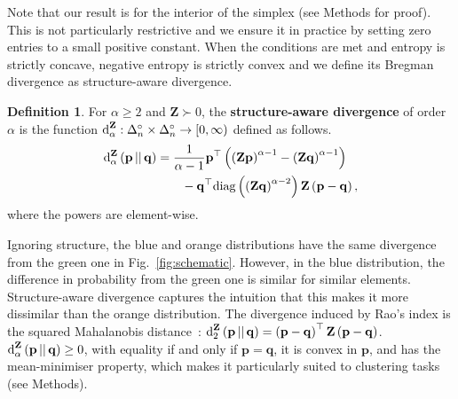 \documentclass[aps,pre,floats,floatfix,superscriptaddress,twocolumn,final,10pt]{revtex4-2}
\theoremstyle{definition}
\newtheorem{definition}{Definition}
\renewcommand{\vec}[1]{\mathbf{#1}}
\newcommand{\divergence}[4]{\textnormal{d}^{#1}_{#2}\left(#3\, || \, #4\right)}
\begin{document}
Note that our result is for the interior of the simplex (see Methods for proof). This is not particularly restrictive and we ensure it in practice by setting zero entries to a small positive constant. When the conditions are met and entropy is strictly concave, negative entropy is strictly convex and we define its Bregman divergence as structure-aware divergence.

\begin{definition}
    For $\alpha \geq 2$ and $\vec{Z}\succ0$, the \textbf{structure-aware divergence} of order $\alpha$ is the function $\textnormal{d}_\alpha^\vec{Z}: \Delta_n^\circ \times \Delta_n^\circ \to [0, \infty)$ defined as follows.
    \begin{equation}
    \begin{split}
         \divergence{\vec{Z}}{\alpha}{\vec{p}}{\vec{q}} &= \frac{1}{\alpha-1} \vec{p}^\top \left( \left( \vec{Zp} \right)^{\alpha - 1} - \left( \vec{Zq} \right)^{\alpha - 1} \right) \\
         &\qquad - \vec{q}^\top \textnormal{diag}\left( \left( \vec{Zq} \right)^{\alpha-2} \right) \vec{Z} \left( \vec{p} - \vec{q} \right),
    \end{split}
    \end{equation}
    where the powers are element-wise.
\end{definition}

Ignoring structure, the blue and orange distributions have the same divergence from the green one in Fig.~\ref{fig:schematic}. However, in the blue distribution, the difference in probability from the green one is similar for similar elements. Structure-aware divergence captures the intuition that this makes it more dissimilar than the orange distribution. The divergence induced by Rao's index is the squared Mahalanobis distance~\cite{Mahalanobis1936}: $\divergence{\vec{Z}}{2}{\vec{p}}{\vec{q}}=\left( \vec{p}-\vec{q} \right)^\top \vec{Z} \left( \vec{p} - \vec{q} \right)$. $\divergence{\vec{Z}}{\alpha}{\vec{p}}{\vec{q}}\geq0$, with equality if and only if $\vec{p}=\vec{q}$, it is convex in $\vec{p}$, and has the mean-minimiser property, which makes it particularly suited to clustering tasks (see Methods).
\end{document}
